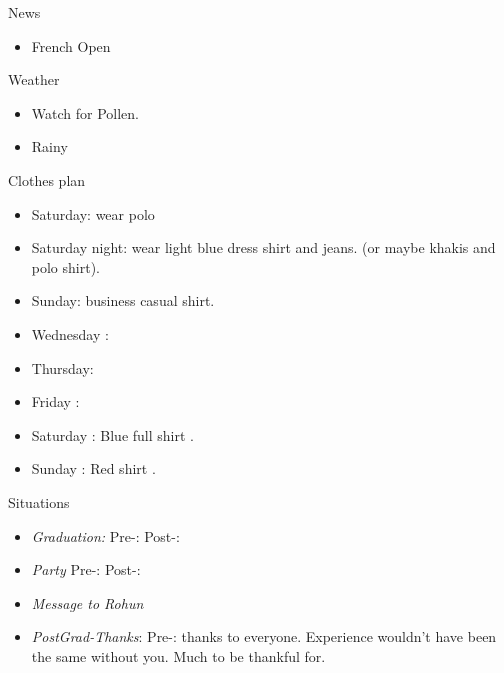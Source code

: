 \documentclass[serif, mathserif, final]{beamer}
\begin{document}
\begin{frame}{}
\begin{columns}
\begin{column}{0.20\linewidth}
  \begin{block}{News}
    \begin{itemize} 
      \tiny \item \tiny French Open
    \end{itemize}
  \end{block}
  \begin{block}{Weather} 
    \begin{itemize}
      \tiny \item \tiny Watch for Pollen.
    \item \tiny Rainy 
    \end{itemize}
  \end{block} 
  \begin{block}{Clothes plan} 
    \begin{itemize} 
      \tiny \item \tiny Saturday: wear polo 
    \item \tiny Saturday night: wear light blue dress shirt and jeans. (or maybe khakis and polo shirt). 
    \item \tiny Sunday: business casual shirt. 
    \item \tiny Wednesday : 
    \item \tiny Thursday: 
    \item \tiny Friday : 
    \item \tiny Saturday : Blue full shirt . 
    \item \tiny Sunday : Red shirt .
    \end{itemize} 
  \end{block}

  \begin{block}{Situations}
    \begin{itemize}
      \item \tiny \textit{Graduation:} Pre-:   Post-: 
      \item \tiny \textit{Party } Pre-:  Post-:

\item \tiny \textit{Message to Rohun} 
        \item \tiny \textit{PostGrad-Thanks}: Pre-: thanks to
          everyone. Experience wouldn't have been the same without
          you. Much to be thankful for. 

        

    \end{itemize}
  \end{block}
\end{column}%
\end{columns}

\end{frame}
\end{document}

